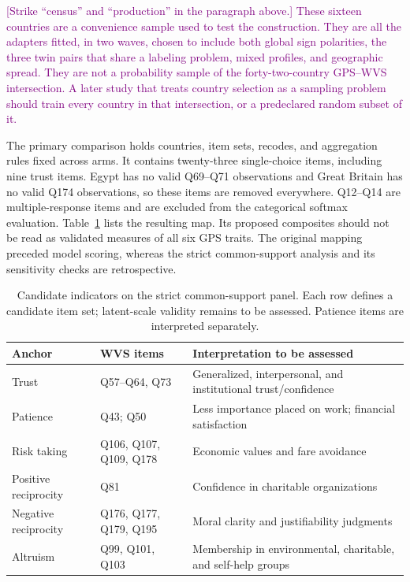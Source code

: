 \textcolor{purple}{[Strike ``census'' and ``production'' in the paragraph above.] These sixteen countries are a convenience sample used to test the construction. They are all the adapters fitted, in two waves, chosen to include both global sign polarities, the three twin pairs that share a labeling problem, mixed profiles, and geographic spread. They are not a probability sample of the forty-two-country GPS--WVS intersection. A later study that treats country selection as a sampling problem should train every country in that intersection, or a predeclared random subset of it.}


The primary comparison holds countries, item sets, recodes, and aggregation rules fixed across arms. It contains twenty-three single-choice items, including nine trust items. Egypt has no valid Q69--Q71 observations and Great Britain has no valid Q174 observations, so these items are removed everywhere. Q12--Q14 are multiple-response items and are excluded from the categorical softmax evaluation. Table~\ref{tab:map} lists the resulting map. Its proposed composites should not be read as validated measures of all six GPS traits. The original mapping preceded model scoring, whereas the strict common-support analysis and its sensitivity checks are retrospective.

\begin{table}[htbp]\centering\small
\caption{Candidate indicators on the strict common-support panel. Each row defines a candidate item set; latent-scale validity remains to be assessed. Patience items are interpreted separately.}\label{tab:map}
\begin{tabularx}{\linewidth}{@{}>{\raggedright\arraybackslash}p{30mm}>{\raggedright\arraybackslash}p{35mm}>{\raggedright\arraybackslash}X@{}}\toprule
Anchor & WVS items & Interpretation to be assessed\\\midrule
Trust & Q57--Q64, Q73 & Generalized, interpersonal, and institutional trust/confidence\\
Patience & Q43; Q50 & Less importance placed on work; financial satisfaction\\
Risk taking & Q106, Q107, Q109, Q178 & Economic values and fare avoidance\\
Positive reciprocity & Q81 & Confidence in charitable organizations\\
Negative reciprocity & Q176, Q177, Q179, Q195 & Moral clarity and justifiability judgments\\
Altruism & Q99, Q101, Q103 & Membership in environmental, charitable, and self-help groups\\\bottomrule
\end{tabularx}\end{table}


